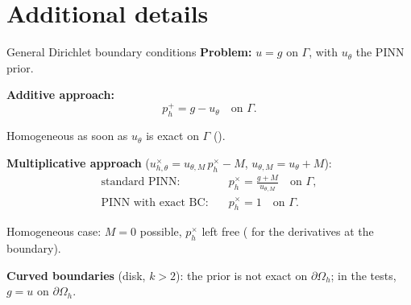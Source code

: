 \section{Additional details}

\begin{frame}{General Dirichlet boundary conditions}
	\textbf{Problem:} $u=g$ on $\Gamma$, with $u_\theta$ the PINN prior.

	\vspace{6pt}
	\textbf{Additive approach:}
	\vspace{-3pt}
	\[
		p_h^+=g-u_\theta \quad\text{on } \Gamma.
	\]
	\vspace{-14pt}

	Homogeneous as soon as $u_\theta$ is exact on $\Gamma$ ().

	\vspace{6pt}
	\textbf{Multiplicative approach} ($u_{h,\theta}^\times=u_{\theta,M}\,p_h^\times-M$, $u_{\theta,M}=u_\theta+M$):
	\vspace{-3pt}
	\begin{align*}
		\text{standard PINN:} \quad      & p_h^\times=\frac{g+M}{u_{\theta,M}} \quad\text{on } \Gamma, \\
		\text{PINN with exact BC:} \quad & p_h^\times=1 \quad\text{on } \Gamma.
	\end{align*}
	\vspace{-14pt}

	Homogeneous case: $M=0$ possible, $p_h^\times$ left free ( for the derivatives at the boundary).

	\vspace{6pt}
	\textbf{Curved boundaries} (disk, $k>2$): the prior is not exact on $\partial\Omega_h$; in the tests, $g=u$ on $\partial\Omega_h$.
\end{frame}

